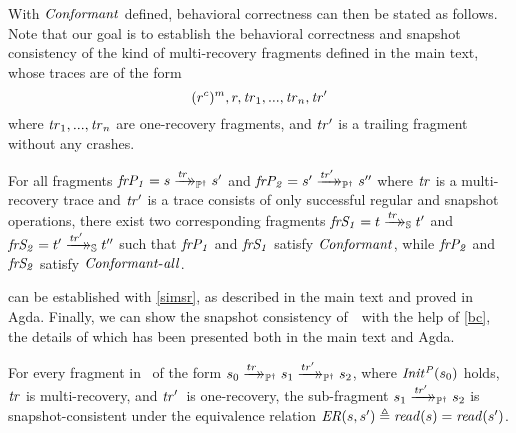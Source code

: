 With $\mathit{Conformant}$ defined, behavioral correctness can then be stated as follows.
Note that our goal is to establish the behavioral correctness and snapshot consistency of the kind of multi-recovery fragments defined in the main text, whose traces are of the form $$(r^c)^m, r, \mathit{tr}_1,...,\mathit{tr}_n,\mathit{tr'}$$ where $\mathit{tr}_1,...,\mathit{tr}_n$ are one-recovery fragments, and $\mathit{tr'}$ is a trailing fragment without any crashes.
\begin{theorem}\label{bc}
For all fragments $\mathit{frP_1} = s \xrightarrow{\mathit{tr}}\mathrel{\mkern-14mu}\rightarrow_{\mathbb P^\dagger} s'$ and $\mathit{frP_2} = s' \xrightarrow{\mathit{tr'}}\mathrel{\mkern-14mu}\rightarrow_{\mathbb P^\dagger} s''$ where $\mathit{tr}$ is a multi-recovery trace and $\mathit{tr'}$ is a trace consists of only successful regular and snapshot operations, there exist two corresponding fragments $\mathit{frS_1} = t \xrightarrow{\mathit{tr}}\mathrel{\mkern-14mu}\rightarrow_{\mathbb S} t'$ and $\mathit{frS_2} = t' \xrightarrow{\mathit{tr'}}\mathrel{\mkern-14mu}\rightarrow_{\mathbb S} t''$ such that $\mathit{frP_1}$ and $\mathit{frS_1}$ satisfy $\mathit{Conformant}$, while $\mathit{frP_2}$ and $\mathit{frS_2}$ satisfy $\mathit{Conformant{\text-}all}$. 
\end{theorem}

 can be established with \cref{simsr}, as described in the main text and proved in Agda.
Finally, we can show the snapshot consistency of~\Prog\ with the help of \cref{bc}, the details of which has been presented both in the main text and Agda.
\begin{theorem}
    For every fragment in \ProgInv\ of the form $s_0 \xrightarrow{tr}\mathrel{\mkern-14mu}\rightarrow_{\mathbb P^\dagger} s_1 \xrightarrow{tr'}\mathrel{\mkern-14mu}\rightarrow_{\mathbb P^\dagger} s_2$, where $\mathit{Init^P}(s_0)$ holds, $\mathit{tr}$ is multi-recovery, and $\mathit{tr}'$~is one-recovery, the sub-fragment $s_1 \xrightarrow{\mathit{tr'}}\mathrel{\mkern-14mu}\rightarrow_{\mathbb P^\dagger} s_2$ is snapshot-consistent under the equivalence relation $\mathit{ER}(s, s') {}\triangleq{} \mathit{read}(s) = \mathit{read}(s')$.
    
\end{theorem} 
